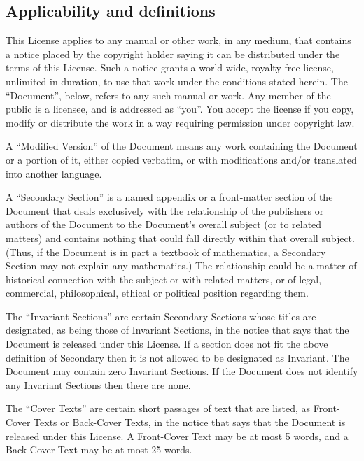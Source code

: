 \subsection{Applicability and definitions\label{subsec:1Applicability-and-definitions}}

{\tiny{}This License applies to any manual or other work, in any medium,
that contains a notice placed by the copyright holder saying it can
be distributed under the terms of this License. Such a notice grants
a world-wide, royalty-free license, unlimited in duration, to use
that work under the conditions stated herein. The “Document'', below,
refers to any such manual or work. Any member of the public is a licensee,
and is addressed as “you''. You accept the license if you copy, modify
or distribute the work in a way requiring permission under copyright
law.}{\tiny\par}

{\tiny{}A “Modified Version'' of the Document means any work containing
the Document or a portion of it, either copied verbatim, or with modifications
and/or translated into another language.}{\tiny\par}

{\tiny{}A “Secondary Section'' is a named appendix or a front-matter
section of the Document that deals exclusively with the relationship
of the publishers or authors of the Document to the Document's overall
subject (or to related matters) and contains nothing that could fall
directly within that overall subject. (Thus, if the Document is in
part a textbook of mathematics, a Secondary Section may not explain
any mathematics.) The relationship could be a matter of historical
connection with the subject or with related matters, or of legal,
commercial, philosophical, ethical or political position regarding
them.}{\tiny\par}

{\tiny{}The “Invariant Sections'' are certain Secondary Sections whose
titles are designated, as being those of Invariant Sections, in the
notice that says that the Document is released under this License.
If a section does not fit the above definition of Secondary then it
is not allowed to be designated as Invariant. The Document may contain
zero Invariant Sections. If the Document does not identify any Invariant
Sections then there are none.}{\tiny\par}

{\tiny{}The “Cover Texts'' are certain short passages of text that
are listed, as Front-Cover Texts or Back-Cover Texts, in the notice
that says that the Document is released under this License. A Front-Cover
Text may be at most 5 words, and a Back-Cover Text may be at most
25 words.}{\tiny\par}

